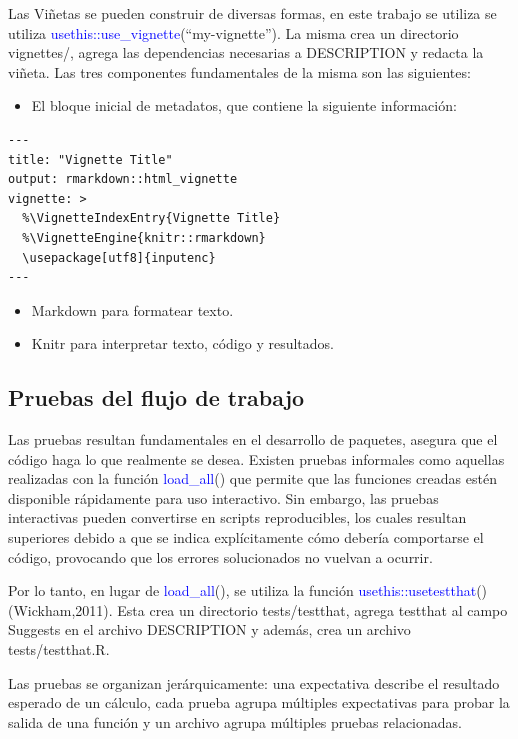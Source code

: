 Las Viñetas se pueden construir de diversas formas, en este trabajo se utiliza se utiliza \textcolor{blue}{usethis::use\_vignette}(``my-vignette''). La misma crea un directorio vignettes/, agrega las dependencias necesarias a DESCRIPTION y redacta la viñeta. Las tres componentes fundamentales de la misma son las siguientes:

\begin{itemize}
\item El bloque inicial de metadatos, que contiene la siguiente información:
\end{itemize}

\begin{verbatim}
---
title: "Vignette Title"
output: rmarkdown::html_vignette
vignette: >
  %\VignetteIndexEntry{Vignette Title}
  %\VignetteEngine{knitr::rmarkdown}
  \usepackage[utf8]{inputenc}
---
\end{verbatim}

\begin{itemize}
\item Markdown para formatear texto.
\item Knitr para interpretar texto, código y resultados.
\end{itemize}

\subsection{Pruebas del flujo de trabajo}

Las pruebas resultan fundamentales en el desarrollo de paquetes, asegura que el código haga lo que realmente se desea. Existen pruebas informales como aquellas realizadas con la función \textcolor{blue}{load\_all}() que permite que las funciones creadas estén disponible rápidamente para uso interactivo. Sin embargo, las pruebas interactivas pueden convertirse en scripts reproducibles, los cuales resultan superiores debido a que se indica explícitamente cómo debería comportarse el código, provocando que los errores solucionados no vuelvan a ocurrir.

Por lo tanto, en lugar de \textcolor{blue}{load\_all}(), se utiliza la función \textcolor{blue}{usethis::usetestthat}() (Wickham,2011). Esta crea un directorio tests/testthat, agrega testthat al campo Suggests en el archivo DESCRIPTION y además, crea un archivo tests/testthat.R.  

Las pruebas se organizan jerárquicamente: una expectativa describe el resultado esperado de un cálculo, cada prueba agrupa múltiples expectativas para probar la salida de una función y un archivo agrupa múltiples pruebas relacionadas.


